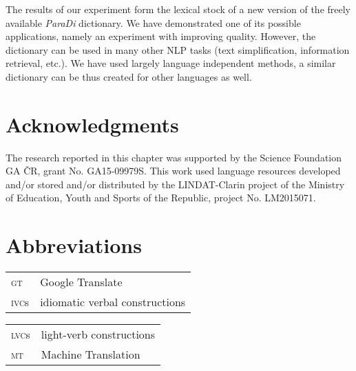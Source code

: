 \documentclass[output=paper,modfonts,nonflat]{langsci/langscibook}
\begin{document}
The results of our experiment form the lexical stock of a new version of the 
freely available \textit{ParaDi} dictionary. We have demonstrated one of its 
possible applications, namely an experiment with improving  
quality. However, the dictionary can be used in many other NLP tasks (text 
simplification, information retrieval, etc.). We have used largely language 
independent methods, a similar dictionary can be thus created for other 
languages as well.

\section*{Acknowledgments}
The research reported in this chapter was supported by the  Science 
Foundation GA ČR, grant No. GA15-09979S. This work used language 
resources developed and/or stored and/or distributed by the LINDAT-Clarin 
project of the Ministry of Education, Youth and Sports of the  Republic, 
project No. LM2015071.

\section*{Abbreviations}
\begin{tabularx}{.5\textwidth}{ll}
\textsc{gt} & Google Translate \\
\textsc{ivc}s & idiomatic verbal constructions \\
\end{tabularx}
\begin{tabularx}{.45\textwidth}{ll}
\textsc{lvc}s & light-verb constructions \\
\textsc{mt} & Machine Translation \\
\end{tabularx}

{\sloppy
\printbibliography[heading=subbibliography,notkeyword=this]
}

\clearpage
\end{document}
